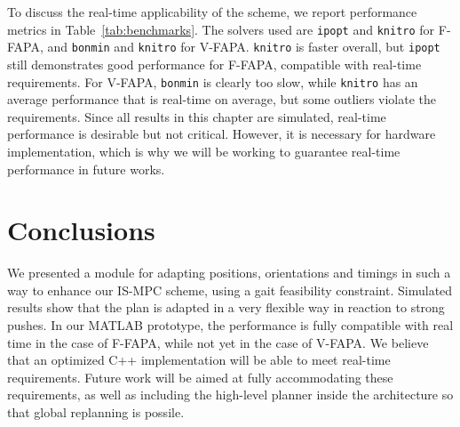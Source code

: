 To discuss the real-time applicability of the scheme, we report performance
metrics in Table~\ref{tab:benchmarks}. The solvers used are \texttt{ipopt}
and \texttt{knitro} for F-FAPA, and \texttt{bonmin} and \texttt{knitro} for
V-FAPA. \texttt{knitro} is faster overall, but \texttt{ipopt} still
demonstrates good performance for F-FAPA, compatible with real-time
requirements. For V-FAPA, \texttt{bonmin} is clearly too slow, while
\texttt{knitro} has an average performance that is real-time on average,
but some outliers violate the requirements. Since all results in this chapter
are simulated, real-time performance is desirable but not critical.
However, it is necessary for hardware implementation, which is why we will
be working to guarantee real-time performance in future works.

\section{Conclusions}
\label{sec:FAPA:Conclusions}
We presented a module for adapting positions, orientations and timings in
such a way to enhance our IS-MPC scheme, using a gait feasibility constraint.
Simulated results show that the plan is adapted in a very flexible way in
reaction to strong pushes. In our MATLAB prototype, the performance is fully
compatible with real time in the case of F-FAPA, while not yet in the case of
V-FAPA. We believe that an optimized C++ implementation will be able to meet
real-time requirements. Future work will be aimed at fully accommodating these
requirements, as well as including the high-level planner
\cite{Cipriano2023RAS} inside the architecture so that global replanning
is possile.
